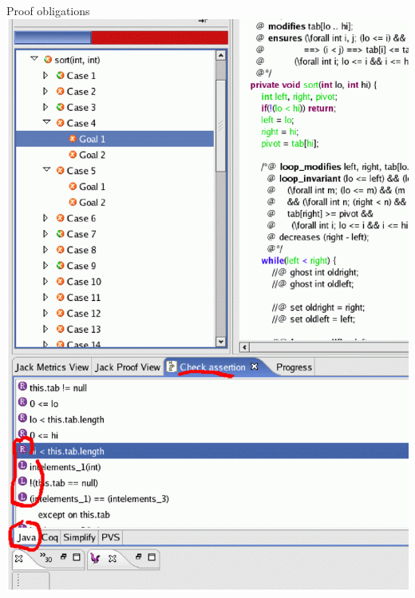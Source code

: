 \documentclass[final,nocolorBG,a4,mobius,nototal,pdf,slideColor]{prosper}
\begin{document}
\begin{slide}{Proof obligations}
\vspace*{-1.5em}
\includegraphics[height=\textheight]{screen6.ps}
\end{slide}
\end{document}
